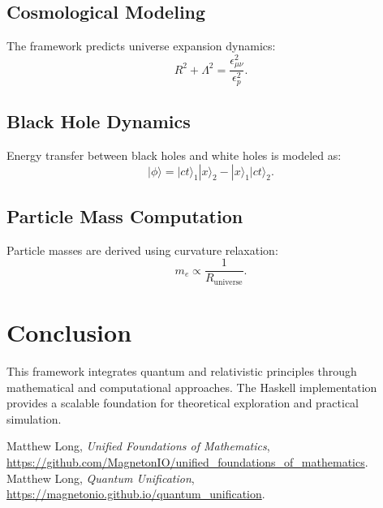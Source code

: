 \documentclass[a4paper,11pt]{article}
\begin{document}
\subsection{Cosmological Modeling}
The framework predicts universe expansion dynamics:
\[
R^2 + \Lambda^2 = \frac{\epsilon_{\mu\nu}^2}{\epsilon_p^2}.
\]

\subsection{Black Hole Dynamics}
Energy transfer between black holes and white holes is modeled as:
\[
| \phi \rangle = |ct \rangle_1 |x \rangle_2 - |x \rangle_1 |ct \rangle_2.
\]

\subsection{Particle Mass Computation}
Particle masses are derived using curvature relaxation:
\[
m_e \propto \frac{1}{R_\text{universe}}.
\]

\section{Conclusion}
This framework integrates quantum and relativistic principles through mathematical and computational approaches. The Haskell implementation provides a scalable foundation for theoretical exploration and practical simulation.


\begin{thebibliography}{9}
Matthew Long, \emph{Unified Foundations of Mathematics}, \url{https://github.com/MagnetonIO/unified_foundations_of_mathematics}.
Matthew Long, \emph{Quantum Unification}, \url{https://magnetonio.github.io/quantum_unification}.
\end{thebibliography}
\end{document}
